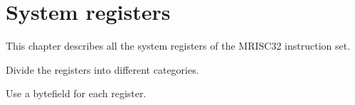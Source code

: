 %

\chapter{System registers}

This chapter describes all the system registers of the MRISC32 instruction set.

\begin{todobox}
    Divide the registers into different categories.

    Use a bytefield for each register.
\end{todobox}

\clearpage


